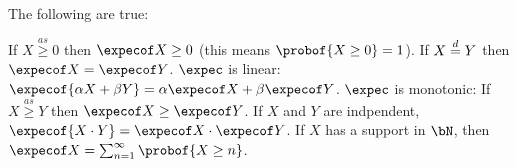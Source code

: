 \begin{thrm*}

	The following are true:
	\begin{msecenumerate}
		\mitem If $X\overset{as}\geq0$ then $\expecof X\geq0$ (this means $\probof{X\geq0}=1$).
		\mitem If $X\mathrel{\overset d=} Y$ then $\expecof X=\expecof Y$.
		\mitem $\expec$ is linear: $\expecof{\alpha X+\beta Y}=\alpha\expecof X+\beta\expecof Y$.
		\mitem $\expec$ is monotonic: If $X\overset{as}\geq Y$ then $\expecof X\geq\expecof Y$.
		\mitem If $X$ and $Y$ are indpendent, $\expecof{X\cdot Y}=\expecof X\cdot\expecof Y$.
		\mitem If $X$ has a support in $\bN$, then $\expecof X=\sum_{n=1}^\infty\probof{X\geq n}$.
	\end{msecenumerate}

\end{thrm*}


